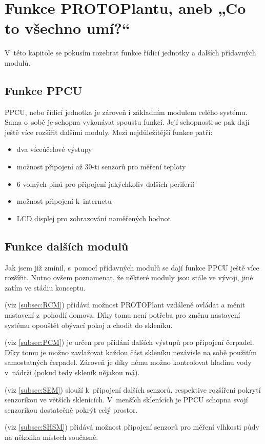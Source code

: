 \chapter{Funkce PROTOPlantu, aneb „Co to všechno umí?“}
V~této kapitole se pokusím rozebrat funkce řídící jednotky a dalších přídavných modulů.

\section{Funkce PPCU}
PPCU, nebo řídící jednotka je zároveň i základním modulem celého systému.
Sama o~sobě je schopna vykonávat spoustu funkcí.
Její schopnosti se pak dají ještě více rozšířit dalšími moduly.
Mezi nejdůležitější funkce patří:
\begin{itemize}
    \item dva víceúčelové výstupy
    \item možnost připojení až 30-ti senzorů pro měření teploty
    \item 6 volných pinů pro připojení jakýchkoliv dalších periferií
    \item možnost připojení k~internetu
    \item LCD displej pro zobrazování naměřených hodnot
\end{itemize}

\section{Funkce dalších modulů}
Jak jsem již zmínil, s~pomocí přídavných modulů se dají funkce PPCU ještě více rozšířit.
Nutno ovšem poznamenat, že některé moduly jsou stále ve vývoji, jiné zatím ve stádiu konceptu.
\newline

\noindent{} (viz \autoref{subsec:RCM}) přidává možnost PROTOPlant vzdáleně ovládat a měnit nastavení z~pohodlí domova.
Díky tomu není potřeba pro změnu nastavení systému opouštět obývací pokoj a chodit do skleníku. \newline

\noindent{} (viz \autoref{subsec:PCM}) je určen pro přidání dalších výstupů pro připojení čerpadel.
Díky tomu je možno zavlažovat každou část skleníku nezávisle na sobě použitím samostatných čerpadel. 
Zároveň je díky němu možno kontrolovat hladinu vody v~nádrži (pokud tedy skleník nějakou má).\newline

\noindent{} (viz \autoref{subsec:SEM}) slouží k~připojení dalších senzorů, respektive rozšíření pokrytí senzorikou ve větších sklenících.
V~menších sklenících je PPCU schopna svojí senzorikou dostatečně pokrýt celý prostor.\newline

\noindent{} (viz \autoref{subsec:SHSM}) přidává možnost připojení senzorů pro měření vlhkosti půdy na několika místech současně.\newline

\newpage